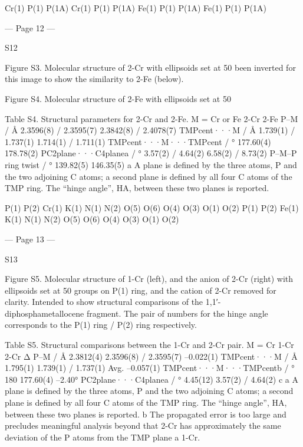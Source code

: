 Cr(1)
P(1)
P(1A)
Cr(1)
P(1)
P(1A)
Fe(1)
P(1)
P(1A)
Fe(1)
P(1)
P(1A)


--- Page 12 ---
 
 
S12 
 
 
 
Figure S3. Molecular structure of 2-Cr with ellipsoids set at 50%
been inverted for this image to show the similarity to 2-Fe (below). 
 
 
Figure S4. Molecular structure of 2-Fe with ellipsoids set at 50%
 
Table S4. Structural parameters for 2-Cr and 2-Fe. 
M = Cr or Fe 
2-Cr 
2-Fe 
P–M / Å 
2.3596(8) / 2.3595(7) 
2.3842(8) / 2.4078(7) 
TMPcent···M / Å 
1.739(1) / 1.737(1) 
1.714(1) / 1.711(1) 
TMPcent···M···TMPcent / ° 
177.60(4) 
178.78(2) 
PC2plane···C4planea / ° 
3.57(2) / 4.64(2) 
6.58(2) / 8.73(2) 
P–M–P ring twist / ° 
139.82(5) 
146.35(5) 
a A plane is defined by the three atoms, P and the two adjoining C atoms; a second plane is defined by all four C atoms of the 
TMP ring. The “hinge angle”, HA, between these two planes is reported. 
 
 
P(1)
P(2)
Cr(1)
K(1)
N(1)
N(2)
O(5)
O(6)
O(4)
O(3)
O(1)
O(2)
P(1)
P(2)
Fe(1)
K(1)
N(1)
N(2)
O(5)
O(6)
O(4)
O(3)
O(1)
O(2)


--- Page 13 ---
 
 
S13 
 
 
 
Figure S5. Molecular structure of 1-Cr (left), and the anion of 2-Cr (right) with ellipsoids set at 50%
groups on P(1) ring, and the cation of 2-Cr removed for clarity. Intended to show structural comparisons of the 1,1′-
diphosphametallocene fragment. The pair of numbers for the hinge angle corresponds to the P(1) ring / P(2) ring respectively. 
 
Table S5. Structural comparisons between the 1-Cr and 2-Cr pair. 
M = Cr 
1-Cr 
2-Cr 
Δ 
P–M / Å 
2.3812(4) 
2.3596(8) / 2.3595(7) 
–0.022(1) 
TMPcent···M / Å 
1.795(1) 
1.739(1) / 1.737(1) 
Avg. –0.057(1) 
TMPcent···M···TMPcentb / ° 
180 
177.60(4) 
–2.40° 
PC2plane···C4planea / ° 
4.45(12) 
3.57(2) / 4.64(2) 
c 
a A plane is defined by the three atoms, P and the two adjoining C atoms; a second plane is defined by all four C atoms of the 
TMP ring. The “hinge angle”, HA, between these two planes is reported. 
b The propagated error is too large and precludes meaningful analysis beyond that 2-Cr has approximately the same deviation 
of the P atoms from the TMP plane a 1-Cr. 
 
